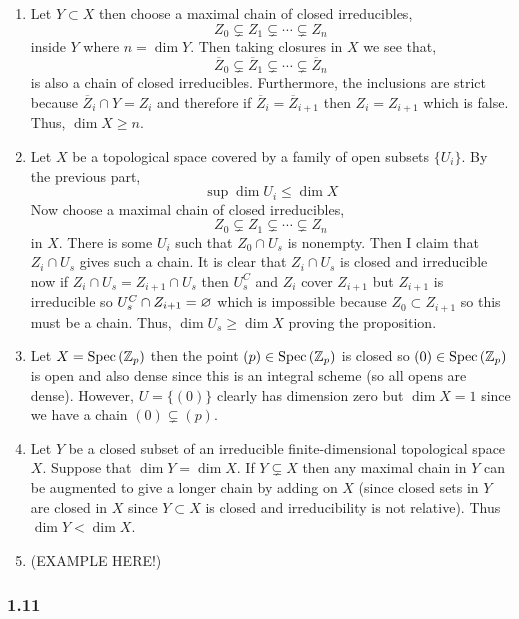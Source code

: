 \documentclass[12pt]{article}
\begin{document}
\begin{enumerate}
\item Let $Y \subset X$ then choose a maximal chain of closed irreducibles,
\[ Z_0 \subsetneq Z_1 \subsetneq \cdots \subsetneq Z_n \]
inside $Y$ where $n = \dim{Y}$. Then taking closures in $X$ we see that,
\[ \overline{Z}_0 \subsetneq \overline{Z}_1 \subsetneq \cdots \subsetneq \overline{Z}_n \]
is also a chain of closed irreducibles. Furthermore, the inclusions are strict because $\overline{Z}_i \cap Y = Z_i$ and therefore if $\overline{Z}_i = \overline{Z}_{i+1}$ then $Z_i = Z_{i+1}$ which is false. Thus, $\dim{X} \ge n$.

\item Let $X$ be a topological space covered by a family of open subsets $\{ U_i \}$. By the previous part,
\[ \sup \dim{U_i} \le \dim{X} \]
Now choose a maximal chain of closed irreducibles,
\[ Z_0 \subsetneq Z_1 \subsetneq \cdots \subsetneq Z_n \]
in $X$. There is some $U_i$ such that $Z_0 \cap U_s$ is nonempty. Then I claim that $Z_i \cap U_s$ gives such a chain. It is clear that $Z_i \cap U_s$ is closed and irreducible now if $Z_i \cap U_s = Z_{i+1} \cap U_s$ then $U_s^C$ and $Z_i$ cover $Z_{i+1}$ but $Z_{i+1}$ is irreducible so $U_s^C \cap Z_{i+1} = \varnothing$ which is impossible because $Z_0 \subset Z_{i+1}$ so this must be a chain. Thus, $\dim{U_s} \ge \dim{X}$ proving the proposition.

\item Let $X = \mathrm{Spec}\left( \mathbb{Z}_p \right)$ then the point $(p) \in \mathrm{Spec}\left( \mathbb{Z}_p \right)$ is closed so $(0) \in \mathrm{Spec}\left( \mathbb{Z}_p \right)$ is open and also dense since this is an integral scheme (so all opens are dense). However, $U = \{ (0) \}$ clearly has dimension zero but $\dim{X} = 1$ since we have a chain $(0) \subsetneq (p)$. 

\item Let $Y$ be a closed subset of an irreducible finite-dimensional topological space $X$. Suppose that $\dim{Y} = \dim{X}$. If $Y \subsetneq X$ then any maximal chain in $Y$ can be augmented to give a longer chain by adding on $X$ (since closed sets in $Y$ are closed in $X$ since $Y \subset X$ is closed and irreducibility is not relative). Thus $\dim{Y} < \dim{X}$.

\item (EXAMPLE HERE!)
\end{enumerate}

\subsubsection{1.11}
\end{document}
